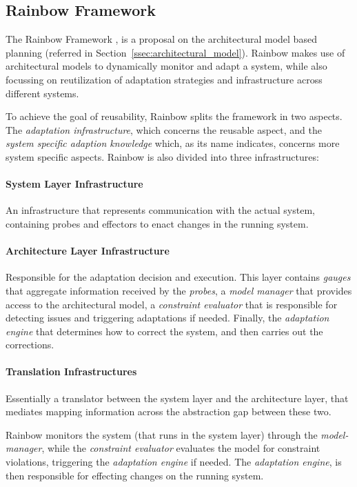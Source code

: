 \subsection{Rainbow Framework}
\label{ssec:rainbowframework}
\par The Rainbow Framework \cite{Garlan2004}, is a proposal on the architectural model based planning (referred in Section~\ref{ssec:architectural_model}). Rainbow makes use of architectural models to dynamically monitor and adapt a system, while also focussing on reutilization of adaptation strategies and infrastructure across different systems.

To achieve the goal of reusability, Rainbow splits the framework in two aspects. The \textit{adaptation infrastructure}, which concerns the reusable aspect, and the \textit{system specific adaption knowledge} which, as its name indicates, concerns more system specific aspects. Rainbow is also divided into three infrastructures:

\paragraph{System Layer Infrastructure} An infrastructure that represents communication with the actual system, containing probes and effectors to enact changes in the running system. 

\paragraph{Architecture Layer Infrastructure} Responsible for the adaptation decision and execution. This layer contains \textit{gauges} that aggregate information received by the \textit{probes}, a \textit{model manager} that provides access to the architectural model, a \textit{constraint evaluator} that is responsible for detecting issues and triggering adaptations if needed. Finally, the \textit{adaptation engine} that determines how to correct the system, and then carries out the corrections.

\paragraph{Translation Infrastructures} Essentially a translator between the system layer and the architecture layer, that mediates mapping information across the abstraction gap between these two.

Rainbow monitors the system (that runs in the system layer) through the \textit{model-manager}, while the \textit{constraint evaluator} evaluates the model for constraint violations, triggering the \textit{adaptation engine} if needed. The \textit{adaptation engine}, is then responsible for effecting changes on the running system.

